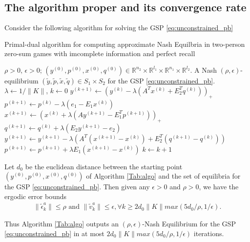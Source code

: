 \documentclass[envcountsame]{llcns2e/llncs}
\begin{document}
\subsection{The algorithm proper and its convergence rate}
Consider the following algorithm for solving the GSP
\eqref{eq:unconstrained_pb}
\begin{algorithm}
\caption{Primal-dual algorithm for computing approximate Nash
  Equilbria in two-person zero-sum games with imcomplete information
  and perfect recall}
\label{Tab:algo}
\begin{algorithmic}[1]
\Require $\rho >0$, $\epsilon > 0$; $(y^{(0)},p^{(0)},x^{(0)},q^{(0)})
\in \mathbb{R}^{n_2}
  \times \mathbb{R}^{l_1} \times \mathbb{R}^{n_1} \times
  \mathbb{R}^{l_2}$.
\Ensure A Nash $(\rho, \epsilon)$-equilibrium
$(\tilde{y},\tilde{p},\tilde{x},\tilde{q}) \in S_1 \times S_2$ for
the GSP \eqref{eq:unconstrained_pb}.
\State  $\lambda \leftarrow 1/\|K\|$,
$k \leftarrow 0$
\State $y^{(k + 1)} \leftarrow (y^{(k)} - \lambda (A^Tx^{(k)} +
E_2^Tq^{(k)}))_+$
\State  \hspace{.5em}$p^{(k+1)} \leftarrow p^{(k)} -
\lambda(e_1-E_1x^{(k)})$
\State $x^{(k + 1)} \leftarrow (x^{(k)} + \lambda (Ay^{(k+1)} -
E_1^Tp^{(k+1)}))_+$
\State  \hspace{.5em}$q^{(k+1)} \leftarrow q^{(k)} +
\lambda(E_2y^{(k+1)}-e_2)$
\State $y^{(k+1)} \leftarrow y^{(k+1)} - \lambda
(A^T(x^{(k+1)}-x^{(k)}) + E_2^T(q^{(k+1)}-q^{(k)}))$
\State $p^{(k+1)} \leftarrow p^{(k+1)} + \lambda E_1(x^{(k+1)}-x^{(k)})$
\State $k \leftarrow k + 1$
\EndWhile
\end{algorithmic}
\end{algorithm}

\begin{theorem}
Let $d_0$ be the euclidean distance between the starting point
$(y^{(0)},p^{(0)},x^{(0)},q^{(0)})$ of Algorithm \ref{Tab:algo} and the
set of equilibria for the GSP \eqref{eq:unconstrained_pb}.
Then given any $\epsilon > 0$ and $\rho > 0$, we have the ergodic
error bounds
\begin{eqnarray}
\|\tilde{\epsilon}^{a}_k\| \le \rho\text{ and }\|\tilde{v}^{a}_k\| \le
\epsilon, \forall k \ge 2d_0\|K\|max(5d_0/\rho, 1/\epsilon).
\end{eqnarray}

Thus Algorithm \ref{Tab:algo} outputs an $(\rho,\epsilon)$-Nash
Equilibrium for the GSP \eqref{eq:unconstrained_pb}
in at most $2d_0\|K\|max(5d_0/\rho, 1/\epsilon)$ iterations.
\end{theorem}
\end{document}
